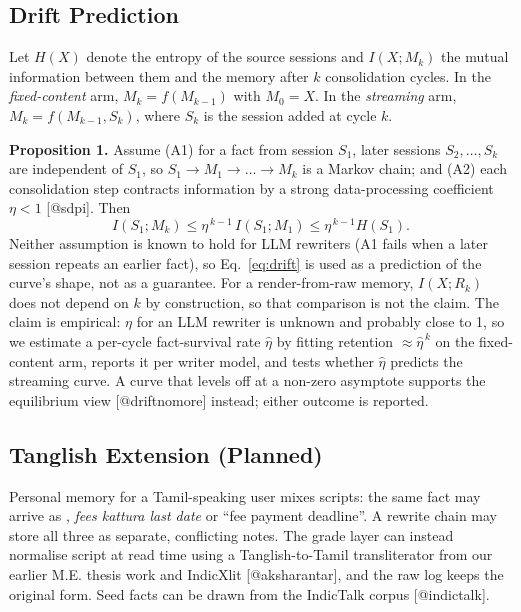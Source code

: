 \subsection{Drift Prediction}
Let $H(X)$ denote the entropy of the source sessions and $I(X; M_k)$ the mutual information between them and the memory after $k$ consolidation cycles. In the \textit{fixed-content} arm, $M_k = f(M_{k-1})$ with $M_0 = X$. In the \textit{streaming} arm, $M_k = f(M_{k-1}, S_k)$, where $S_k$ is the session added at cycle $k$.

\textbf{Proposition 1.} Assume (A1) for a fact from session $S_1$, later sessions $S_2, \dots, S_k$ are independent of $S_1$, so $S_1 \rightarrow M_1 \rightarrow \dots \rightarrow M_k$ is a Markov chain; and (A2) each consolidation step contracts information by a strong data-processing coefficient $\eta < 1$ [@sdpi]. Then
\begin{equation}
I(S_1; M_k) \le \eta^{\,k-1}\, I(S_1; M_1) \le \eta^{\,k-1} H(S_1).
\label{eq:drift}
\end{equation}
Neither assumption is known to hold for LLM rewriters (A1 fails when a later session repeats an earlier fact), so Eq.~\eqref{eq:drift} is used as a prediction of the curve's shape, not as a guarantee. For a render-from-raw memory, $I(X; R_k)$ does not depend on $k$ by construction, so that comparison is not the claim. The claim is empirical: $\eta$ for an LLM rewriter is unknown and probably close to 1, so we estimate a per-cycle fact-survival rate $\hat\eta$ by fitting retention $\approx \hat\eta^{\,k}$ on the fixed-content arm, reports it per writer model, and tests whether $\hat\eta$ predicts the streaming curve. A curve that levels off at a non-zero asymptote supports the equilibrium view [@driftnomore] instead; either outcome is reported.

\subsection{Tanglish Extension (Planned)}
Personal memory for a Tamil-speaking user mixes scripts: the same fact may arrive as , \textit{fees kattura last date} or ``fee payment deadline''. A rewrite chain may store all three as separate, conflicting notes. The grade layer can instead normalise script at read time using a Tanglish-to-Tamil transliterator from our earlier M.E. thesis work and IndicXlit [@aksharantar], and the raw log keeps the original form. Seed facts can be drawn from the IndicTalk corpus [@indictalk].

